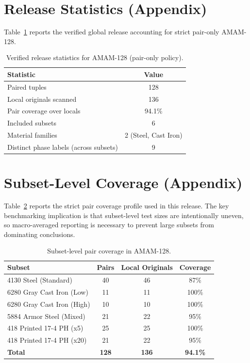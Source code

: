 \documentclass{article}
\newcommand{\datasetname}{AMAM-128}
\newcommand{\paircount}{128}
\newcommand{\subsetcount}{6}
\newcommand{\origcount}{136}
\newcommand{\paircoverage}{94.1\%}
\newcommand{\tablefontsize}{\small}
\begin{document}
\section{Release Statistics (Appendix)}
Table~\ref{tab:globalstats} reports the verified global release accounting for strict pair-only AMAM-128.
\begin{table}[ht]
    \centering
    \tablefontsize
    \caption{Verified release statistics for \datasetname{} (pair-only policy).}
    \label{tab:globalstats}
    \begin{tabular}{lc}
        \toprule
        Statistic & Value \\
        \midrule
        Paired tuples & \paircount{} \\
        Local originals scanned & \origcount{} \\
        Pair coverage over locals & \paircoverage{} \\
        Included subsets & \subsetcount{} \\
        Material families & 2 (Steel, Cast Iron) \\
        Distinct phase labels (across subsets) & 9 \\
        \bottomrule
    \end{tabular}
\end{table}

\section{Subset-Level Coverage (Appendix)}
Table~\ref{tab:subsetcoverage} reports the strict pair coverage profile used in this release. The key benchmarking implication is that subset-level test sizes are intentionally uneven, so macro-averaged reporting is necessary to prevent large subsets from dominating conclusions.
\begin{table}[ht]
    \centering
    \tablefontsize
    \caption{Subset-level pair coverage in \datasetname{}.}
    \label{tab:subsetcoverage}
    \begin{tabular}{lccc}
        \toprule
        Subset & Pairs & Local Originals & Coverage \\
        \midrule
        4130 Steel (Standard) & 40 & 46 & 87\% \\
        6280 Gray Cast Iron (Low) & 11 & 11 & 100\% \\
        6280 Gray Cast Iron (High) & 10 & 10 & 100\% \\
        5884 Armor Steel (Mixed) & 21 & 22 & 95\% \\
        418 Printed 17-4 PH (x5) & 25 & 25 & 100\% \\
        418 Printed 17-4 PH (x20) & 21 & 22 & 95\% \\
        \midrule
        \textbf{Total} & \textbf{128} & \textbf{136} & \textbf{94.1\%} \\
        \bottomrule
    \end{tabular}
\end{table}
\end{document}
